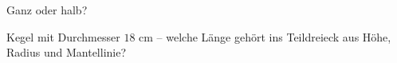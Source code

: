 \setcounter{aufgabe}{20}

\begin{aufgabe}{Ganz oder halb?}
\begin{teile}
\teil Kegel mit Durchmesser $18$ cm – welche Länge gehört ins Teildreieck aus Höhe, Radius und Mantellinie? \\  \\ 

\end{teile}
\end{aufgabe}

